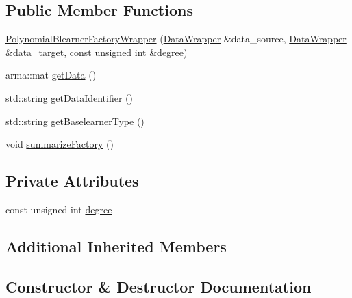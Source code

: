 \subsection*{Public Member Functions}
\begin{DoxyCompactItemize}
\item 
\mbox{\hyperlink{class_polynomial_blearner_factory_wrapper_aff6c82400439d55fa1e9b1827089c461}{Polynomial\+Blearner\+Factory\+Wrapper}} (\mbox{\hyperlink{class_data_wrapper}{Data\+Wrapper}} \&data\+\_\+source, \mbox{\hyperlink{class_data_wrapper}{Data\+Wrapper}} \&data\+\_\+target, const unsigned int \&\mbox{\hyperlink{class_polynomial_blearner_factory_wrapper_aae00b359ac0ee8cfefb99ddfc5192fa6}{degree}})
\item 
arma\+::mat \mbox{\hyperlink{class_polynomial_blearner_factory_wrapper_a7949c6384e31e69033cfe0cd96ea9746}{get\+Data}} ()
\item 
std\+::string \mbox{\hyperlink{class_polynomial_blearner_factory_wrapper_a1711f3a9554faf63a03bf625fe39491a}{get\+Data\+Identifier}} ()
\item 
std\+::string \mbox{\hyperlink{class_polynomial_blearner_factory_wrapper_afc3c4e2e5b3aa482cdb6e8fad0180442}{get\+Baselearner\+Type}} ()
\item 
void \mbox{\hyperlink{class_polynomial_blearner_factory_wrapper_a299f322f5ffddec00791bbba97c92093}{summarize\+Factory}} ()
\end{DoxyCompactItemize}
\subsection*{Private Attributes}
\begin{DoxyCompactItemize}
\item 
const unsigned int \mbox{\hyperlink{class_polynomial_blearner_factory_wrapper_aae00b359ac0ee8cfefb99ddfc5192fa6}{degree}}
\end{DoxyCompactItemize}
\subsection*{Additional Inherited Members}


\subsection{Constructor \& Destructor Documentation}
\mbox{\label{class_polynomial_blearner_factory_wrapper_aff6c82400439d55fa1e9b1827089c461}} 
